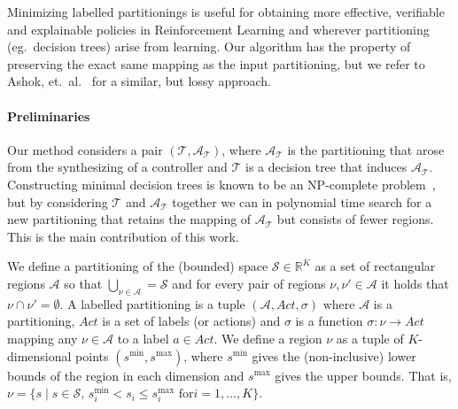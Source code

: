 \documentclass{easychair}
\begin{document}
Minimizing labelled partitionings is useful for obtaining more effective,
verifiable and explainable policies in Reinforcement Learning and wherever
partitioning (eg.\ decision trees) arise from learning. Our algorithm has the
property of preserving the exact same mapping as the input partitioning, but we
refer to Ashok, et.\ al.\ \cite{ashokDtControlDecisionTree2020a} for a similar,
but lossy approach.

\paragraph{Preliminaries} Our method considers a pair $(\mathcal{T},
\mathcal{A}_{\mathcal{T}})$, where $\mathcal{A}_{\mathcal{T}}$ is the
partitioning that arose from the synthesizing of a controller and $\mathcal{T}$
is a decision tree that induces $\mathcal{A}_{\mathcal{T}}$. Constructing
minimal decision trees is known to be an NP-complete
problem~\cite{hyafilConstructingOptimalBinary1976}, but by considering
$\mathcal{T}$ and $\mathcal{A}_{\mathcal{T}}$ together we can in polynomial time
search for a new partitioning that retains the mapping of
$\mathcal{A}_{\mathcal{T}}$ but consists of fewer regions. This is the main
contribution of this work.

We define a partitioning of the (bounded) space $\mathcal{S} \in \mathbb{R}^K$
as a set of rectangular regions $\mathcal{A}$ so that $\bigcup_{\nu \in
\mathcal{A}} = \mathcal{S}$ and for every pair of regions $\nu,\nu' \in
\mathcal{A}$ it holds that $\nu \cap \nu' = \emptyset$. A labelled partitioning is
a tuple $(\mathcal{A}, Act, \sigma)$ where $\mathcal{A}$ is a partitioning,
$Act$ is a set of labels (or actions) and $\sigma$ is a function $\sigma : \nu
\rightarrow Act$ mapping any $\nu \in \mathcal{A}$ to a label $a \in Act$. We
define a region $\nu$ as a tuple of $K$-dimensional points $(s^{\min},
s^{\max})$, where $s^{\min}$ gives the (non-inclusive) lower bounds of the
region in each dimension and $s^{\max}$ gives the upper bounds. That is, $\nu =
\{s \mid s \in \mathcal{S}, \, s^{\min}_{i} < s_{i} \leq s^{\max}_{i} \text{ for
} i = 1,\ldots,K \}$.
\end{document}
